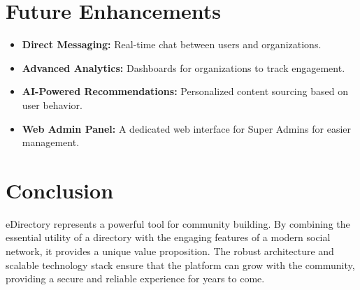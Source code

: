 \documentclass[12pt, a4paper]{report}
\begin{document}
\chapter{Future Enhancements}
\begin{itemize}
    \item \textbf{Direct Messaging:} Real-time chat between users and organizations.
    \item \textbf{Advanced Analytics:} Dashboards for organizations to track engagement.
    \item \textbf{AI-Powered Recommendations:} Personalized content sourcing based on user behavior.
    \item \textbf{Web Admin Panel:} A dedicated web interface for Super Admins for easier management.
\end{itemize}

\chapter{Conclusion}
eDirectory represents a powerful tool for community building. By combining the essential utility of a directory with the engaging features of a modern social network, it provides a unique value proposition. The robust architecture and scalable technology stack ensure that the platform can grow with the community, providing a secure and reliable experience for years to come.
\end{document}
